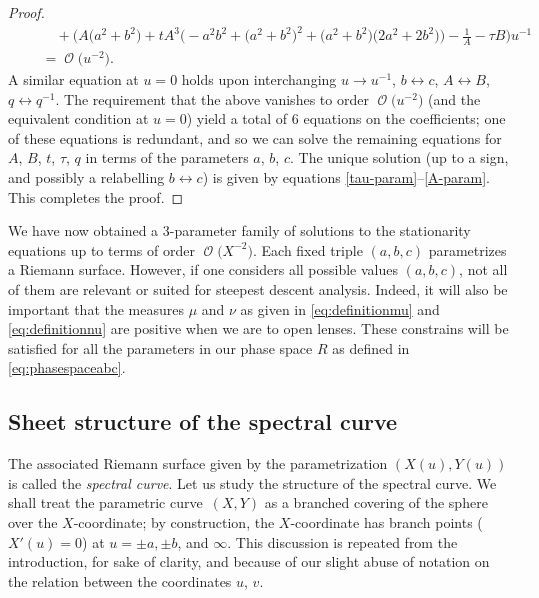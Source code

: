 \documentclass[10pt,a4paper]{amsart}
\DeclareMathOperator{\OO}{\mathcal{O}}
\numberwithin{equation}{section}
\begin{document}
\begin{proof}
\begin{gather*}
 \qquad\quad{}+ \biggl( A\bigl(a^2 + b^2\bigr) + t A^3\bigl(-a^2b^2 + \bigl(a^2 + b^2\bigr)^2 + \bigl(a^2 + b^2\bigr)\bigl(2a^2 + 2b^2\bigr)\bigr) - \frac{1}{A} - \tau B \biggr) u^{-1} \\
 \qquad{}= \OO\bigl(u^{-2}\bigr).
 \end{gather*}
A similar equation at $u=0$ holds upon interchanging $u\to u^{-1}$, $b\leftrightarrow c$, $A\leftrightarrow B$, $q\leftrightarrow q^{-1}$. The requirement that the above vanishes to order $\OO\bigl(u^{-2}\bigr)$ (and the equivalent condition at $u=0$) yield a total of $6$ equations on the coefficients; one of these equations is redundant, and so we can solve the remaining equations for $A$, $B$, $t$, $\tau$, $q$ in terms of the parameters $a$, $b$, $c$. The unique solution (up to a sign, and possibly a relabelling $b\leftrightarrow c$) is given by equations \eqref{tau-param}--\eqref{A-param}. This completes the proof.
\end{proof}

We have now obtained a $3$-parameter family of solutions to the stationarity equations up to terms of order $\OO\bigl(X^{-2}\bigr)$. Each fixed triple $(a,b,c)$ parametrizes a Riemann surface. However, if one considers all possible values $(a,b,c)$, not all of them are relevant or suited for steepest descent analysis. Indeed, it will also be important that the measures $\mu$ and $\nu$ as given in \eqref{eq:definitionmu} and \eqref{eq:definitionnu} are positive when we are to open lenses. These constrains will be satisfied for all the parameters in our phase space $R$ as defined in \eqref{eq:phasespaceabc}.

\subsection{Sheet structure of the spectral curve}


The associated Riemann surface given by the parametrization $(X(u),Y(u))$ is called the \textit{spectral curve}. Let us study the structure of the spectral curve. We shall treat the parametric curve~$(X,Y)$ as a branched covering of the sphere over the $X$-coordinate; by construction, the $X$-coordinate has branch points ($X'(u) = 0$) at $u = \pm a,\pm b$, and $\infty$. This discussion is repeated from the introduction, for sake of clarity, and because of our slight abuse of notation on the relation between the coordinates $u$, $v$.
\end{document}
